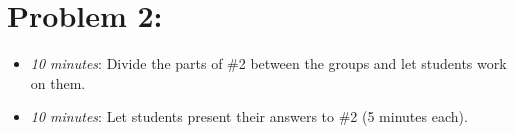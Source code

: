 \documentclass[handout,nooutcomes]{ximera}
\begin{document}
\section{Problem 2:}

	\begin{itemize}
	
	\item  \emph{10 minutes}:  Divide the parts of \#2 between the groups and let students work on them.
		
	\item  \emph{10 minutes}:  Let students present their answers to \#2 (5 minutes each).
			
	\end{itemize}
	
	
	

	
	
	

	
	

	
	
	

	
	
	
\end{document}
